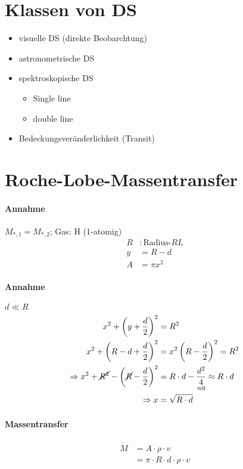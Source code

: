 \section{Klassen von DS}
\begin{itemize}
    \item visuelle DS (direkte Beobarchtung)
    \item astronometrische DS
    \item spektroskopische DS
        \begin{itemize}
            \item Single line
            \item double line
        \end{itemize}
    \item Bedeckungsveränderlichkeit (Transit)
\end{itemize}

\section{Roche-Lobe-Massentransfer}

\paragraph{Annahme} $M_{*,1} = M_{*,2}$; Gas: H (1-atomig)
\begin{align*}
    R &: \text{Radius-$RL$} \\
    y &= R - d \\
    A &= \pi x^2
\end{align*}

\paragraph{Annahme} $\boxed{d \ll R}$
\begin{align*}
    x^2 + \left(y + \frac{d}{2}\right)^2 &= R^2 \\
    x^2 + \left(R - d + \frac{d}{2}\right)^2 &= x^2 \left(R - \frac{d}{2}\right)^2 = R^2 \\
    \Rightarrow x^2 + \cancel{R^2} - \left(\cancel{R} - \frac{d}{2}\right)^2 &= R \cdot d - \underset{\approx 0}{\frac{d^2}{4}} \approx R \cdot d \\
    \Rightarrow x &= \sqrt{R \cdot d}
\end{align*}

\paragraph{Massentransfer}
\begin{align*}
    \dot M &= A \cdot \rho \cdot v \\
           &= \pi \cdot R \cdot d \cdot \rho \cdot v
\end{align*}

